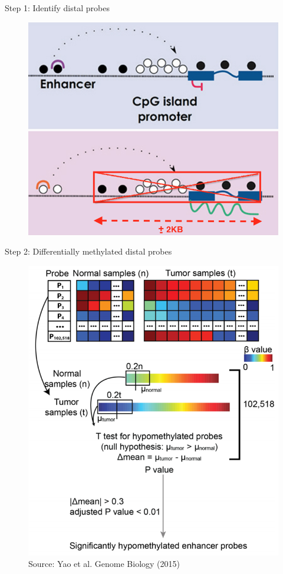 \documentclass[slidestop,compress,11pt,xcolor=dvipsnames]{beamer}
\begin{document}
\begin{frame}{Step 1: Identify distal probes}
 \begin{figure}
  \centering
  \includegraphics[width=0.7\linewidth]{step1.png}
 \end{figure}
\end{frame}


\begin{frame}{Step 2: Differentially methylated distal probes}
 \vspace*{-0.4cm}
 \begin{figure}
  \centering
  \includegraphics[width=0.57\linewidth]{ELMER/diffmeth.png}{\tiny{\\\vspace*{-0.2cm}Source: Yao et al. Genome Biology (2015)}}
 \end{figure}
\end{frame}
\end{document}
